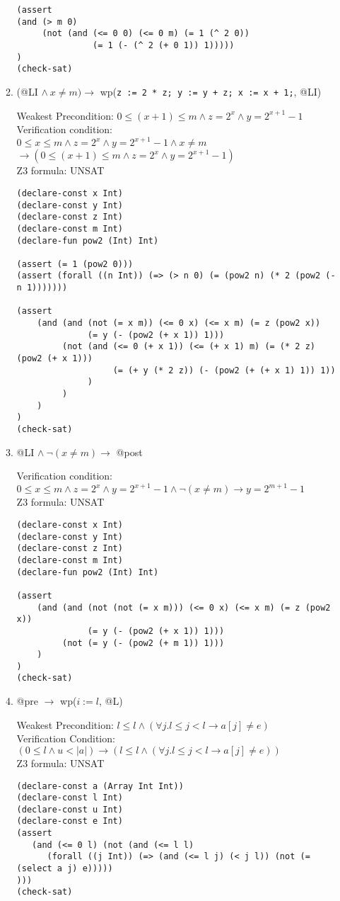 \documentclass{article}
\begin{document}
\begin{enumerate}
\begin{enumerate}[(1)]
\begin{verbatim}
(assert 
(and (> m 0) 
     (not (and (<= 0 0) (<= 0 m) (= 1 (^ 2 0))
               (= 1 (- (^ 2 (+ 0 1)) 1)))))
)
(check-sat)
\end{verbatim}

\item (@LI $\land\ x \neq m) \to$ wp(\verb|z := 2 * z; y := y + z; x := x + 1;|, @LI)

        Weakest Precondition: $0 \leq (x + 1) \leq m \land z = 2^x \land y = 2^{x + 1} - 1$ \\
        Verification condition:\\
        $0 \leq x \leq m \land z = 2^x \land y = 2^{x + 1} - 1 \land x \neq m$ \\
        $\to (0 \leq (x + 1) \leq m \land z = 2^x \land y = 2^{x + 1} - 1)$ \\
        Z3 formula: UNSAT
\begin{verbatim}
(declare-const x Int)
(declare-const y Int)
(declare-const z Int)
(declare-const m Int)
(declare-fun pow2 (Int) Int)

(assert (= 1 (pow2 0)))
(assert (forall ((n Int)) (=> (> n 0) (= (pow2 n) (* 2 (pow2 (- n 1)))))))

(assert
    (and (and (not (= x m)) (<= 0 x) (<= x m) (= z (pow2 x))
              (= y (- (pow2 (+ x 1)) 1)))
         (not (and (<= 0 (+ x 1)) (<= (+ x 1) m) (= (* 2 z) (pow2 (+ x 1)))
                   (= (+ y (* 2 z)) (- (pow2 (+ (+ x 1) 1)) 1))
              )
         )
    )
)
(check-sat)
\end{verbatim}

\item @LI $\land\ \neg(x\neq m) \to$ @post

        Verification condition:\\
        $0 \leq x \leq m \land z = 2^x \land y = 2^{x + 1} - 1 \land \neg(x \neq m) \to y = 2^{m+1} - 1$\\
        Z3 formula: UNSAT
\begin{verbatim}
(declare-const x Int)
(declare-const y Int)
(declare-const z Int)
(declare-const m Int)
(declare-fun pow2 (Int) Int)

(assert
    (and (and (not (not (= x m))) (<= 0 x) (<= x m) (= z (pow2 x))
              (= y (- (pow2 (+ x 1)) 1)))
         (not (= y (- (pow2 (+ m 1)) 1)))
    )
)
(check-sat)
\end{verbatim}

\item @pre $\to$ wp($i := l$, @L)

		Weakest Precondition: $l \leq l \land (\forall j. l\leq j < l \to a[j] \neq e)$\\
		Verification Condition:
		$(0 \leq l \land u < |a|) \to (l \leq l \land (\forall j. l\leq j < l\to a[j] \neq e))$\\
		Z3 formula: UNSAT
\begin{verbatim}
(declare-const a (Array Int Int))
(declare-const l Int)
(declare-const u Int)
(declare-const e Int)
(assert
   (and (<= 0 l) (not (and (<= l l) 
      (forall ((j Int)) (=> (and (<= l j) (< j l)) (not (= (select a j) e)))))
)))
(check-sat)
\end{verbatim}


\end{enumerate}
\end{enumerate}
\end{document}
